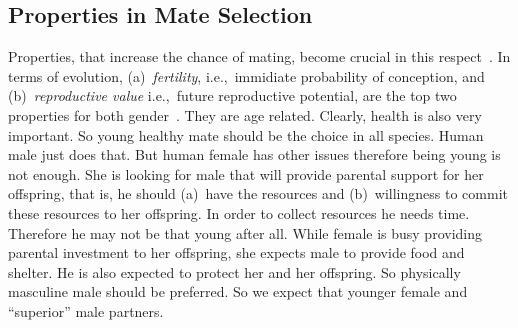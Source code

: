 \documentclass[journal,comsoc]{IEEEtran}
\newcommand{\hbie}{i.e.,}
\newcommand{\hbeg}{e.g.,}
\newcommand{\hbIdea}[1]{{\color{red}{\scriptsize [{#1}]}}}
\begin{document}
\subsection{Properties in Mate Selection}

%
%


\hbIdea{mating properties} %
Properties, 
that increase the chance of mating, 
become crucial in this respect~\cite{
	Buss1989,
	Buss1993,
	Buss2006,
	Trivers1972,
	Kenrick1992, %
	Gillis1980, %
	Pawlowski2000Nature,  %
	Swami2008,  %
	Silverman1992,  %
	Buss2003Book}.  %
\hbIdea{age} %
In terms of evolution,
% 
(a)~\emph{fertility},
\hbie~immidiate probability of conception,
and
%
(b)~\emph{reproductive value}
\hbie~future reproductive potential,
are the top two properties for both 
gender~\cite{
	Buss2006}.
	They are age related.
Clearly, health is also very important.
So young healthy mate should be the choice in all species.
Human male just does that.
But human female has other issues therefore being young is not enough.
She is looking for male that will provide parental support for her offspring,
that is,
he should 
%
(a)~have the resources and 
%
(b)~willingness to commit these resources to her offspring.
In order to collect resources he needs time.
Therefore he may not be that young after all.
\hbIdea{physical} %
While female is busy providing parental investment to her offspring,
she expects male 
to provide food and shelter.
He is also expected to protect her and her offspring.
So physically masculine male should be preferred. 
\hbIdea{expect} %
So we expect that younger female and 
``superior'' male partners.
\end{document}
